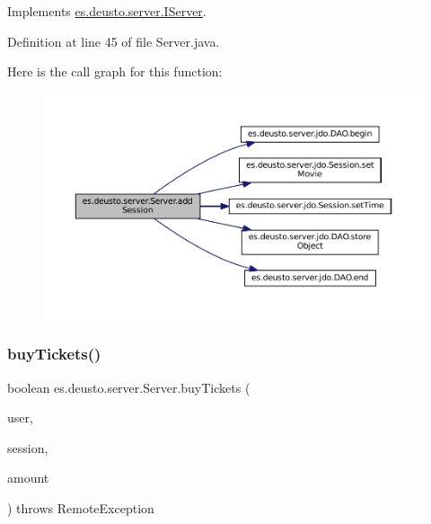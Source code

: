 Implements \mbox{\hyperlink{interfacees_1_1deusto_1_1server_1_1_i_server_a1e1a4e176284ef7aec05142fb85b9a72}{es.\+deusto.\+server.\+I\+Server}}.



Definition at line 45 of file Server.\+java.

Here is the call graph for this function\+:
\nopagebreak
\begin{figure}[H]
\begin{center}
\leavevmode
\includegraphics[width=350pt]{classes_1_1deusto_1_1server_1_1_server_abca83b4649011a8a68af754bbd25e22d_cgraph}
\end{center}
\end{figure}
\mbox{\label{classes_1_1deusto_1_1server_1_1_server_a3bbf9f19774d2fae5c831cfac1f2306c}} 
\subsubsection{\texorpdfstring{buyTickets()}{buyTickets()}}
{\footnotesize\ttfamily boolean es.\+deusto.\+server.\+Server.\+buy\+Tickets (\begin{DoxyParamCaption}\item[{\mbox{\hyperlink{classes_1_1deusto_1_1server_1_1data_1_1_user_d_t_o}{User\+D\+TO}}}]{user,  }\item[{\mbox{\hyperlink{classes_1_1deusto_1_1server_1_1data_1_1_session_d_t_o}{Session\+D\+TO}}}]{session,  }\item[{int}]{amount }\end{DoxyParamCaption}) throws Remote\+Exception}



